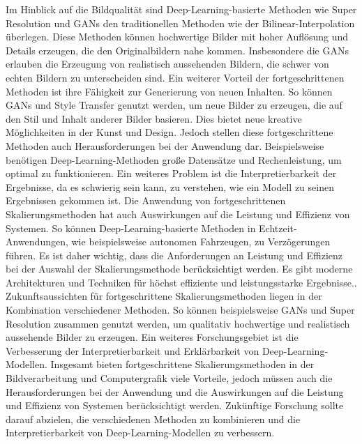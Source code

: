     Im Hinblick auf die Bildqualität sind Deep-Learning-basierte Methoden wie Super Resolution und GANs den traditionellen Methoden wie der Bilinear-Interpolation überlegen.      
    Diese Methoden können hochwertige Bilder mit hoher Auflösung und Details erzeugen, die den Originalbildern nahe kommen.      
    Insbesondere die GANs erlauben die Erzeugung von realistisch aussehenden Bildern, die schwer von echten Bildern zu unterscheiden sind.
    Ein weiterer Vorteil der fortgeschrittenen Methoden ist ihre Fähigkeit zur Generierung von neuen Inhalten.   
    So können GANs und Style Transfer genutzt werden, um neue Bilder zu erzeugen, die auf den Stil und Inhalt anderer Bilder basieren.      
    Dies bietet neue kreative Möglichkeiten in der Kunst und Design.
    Jedoch stellen diese fortgeschrittene Methoden auch Herausforderungen bei der Anwendung dar.      
    Beispielsweise benötigen Deep-Learning-Methoden große Datensätze und Rechenleistung, um optimal zu funktionieren.      
    Ein weiteres Problem ist die Interpretierbarkeit der Ergebnisse, da es schwierig sein kann, zu verstehen, wie ein Modell zu seinen Ergebnissen gekommen ist.
    Die Anwendung von fortgeschrittenen Skalierungsmethoden hat auch Auswirkungen auf die Leistung und Effizienz von Systemen.      
    So können Deep-Learning-basierte Methoden in Echtzeit-Anwendungen, wie beispielsweise autonomen Fahrzeugen, zu Verzögerungen führen.      
    Es ist daher wichtig, dass die Anforderungen an Leistung und Effizienz bei der Auswahl der Skalierungsmethode berücksichtigt werden.      
    Es gibt moderne Architekturen und Techniken für höchst effiziente und leistungsstarke Ergebnisse..
    Zukunftsaussichten für fortgeschrittene Skalierungsmethoden liegen in der Kombination verschiedener Methoden. 
    So können beispielsweise GANs und Super Resolution zusammen genutzt werden, um qualitativ hochwertige und realistisch aussehende Bilder zu erzeugen.      
    Ein weiteres Forschungsgebiet ist die Verbesserung der Interpretierbarkeit und Erklärbarkeit von Deep-Learning-Modellen.      
    Insgesamt bieten fortgeschrittene Skalierungsmethoden in der Bildverarbeitung und Computergrafik viele Vorteile, jedoch müssen auch die Herausforderungen bei der Anwendung und die Auswirkungen auf die Leistung und Effizienz von Systemen berücksichtigt werden.      
    Zukünftige Forschung sollte darauf abzielen, die verschiedenen Methoden zu kombinieren und die Interpretierbarkeit von Deep-Learning-Modellen zu verbessern.

\newpage